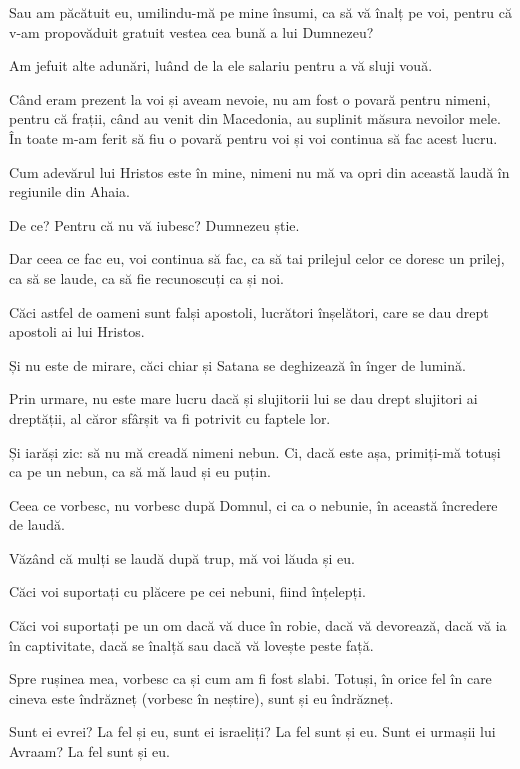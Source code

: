 {\par }{\PP {}Sau am păcătuit eu, umilindu-mă pe mine însumi, ca să vă înalț pe voi, pentru că v-am propovăduit gratuit vestea cea bună a lui Dumnezeu?

Am jefuit alte adunări, luând de la ele salariu pentru a vă sluji vouă.

Când eram prezent la voi și aveam nevoie, nu am fost o povară pentru nimeni, pentru că frații, când au venit din Macedonia, au suplinit măsura nevoilor mele. În toate m-am ferit să fiu o povară pentru voi și voi continua să fac acest lucru.

Cum adevărul lui Hristos este în mine, nimeni nu mă va opri din această laudă în regiunile din Ahaia.

De ce? Pentru că nu vă iubesc? Dumnezeu știe.


\par }{\PP {}Dar ceea ce fac eu, voi continua să fac, ca să tai prilejul celor ce doresc un prilej, ca să se laude, ca să fie recunoscuți ca și noi.

Căci astfel de oameni sunt falși apostoli, lucrători înșelători, care se dau drept apostoli ai lui Hristos.

Și nu este de mirare, căci chiar și Satana se deghizează în înger de lumină.

Prin urmare, nu este mare lucru dacă și slujitorii lui se dau drept slujitori ai dreptății, al căror sfârșit va fi potrivit cu faptele lor.


\par }{\PP {}Și iarăși zic: să nu mă creadă nimeni nebun. Ci, dacă este așa, primiți-mă totuși ca pe un nebun, ca să mă laud și eu puțin.

Ceea ce vorbesc, nu vorbesc după Domnul, ci ca o nebunie, în această încredere de laudă.

Văzând că mulți se laudă după trup, mă voi lăuda și eu.

Căci voi suportați cu plăcere pe cei nebuni, fiind înțelepți.

Căci voi suportați pe un om dacă vă duce în robie, dacă vă devorează, dacă vă ia în captivitate, dacă se înalță sau dacă vă lovește peste față.

Spre rușinea mea, vorbesc ca și cum am fi fost slabi. Totuși, în orice fel în care cineva este îndrăzneț (vorbesc în neștire), sunt și eu îndrăzneț.

Sunt ei evrei? La fel și eu, sunt ei israeliți? La fel sunt și eu. Sunt ei urmașii lui Avraam? La fel sunt și eu.

}
